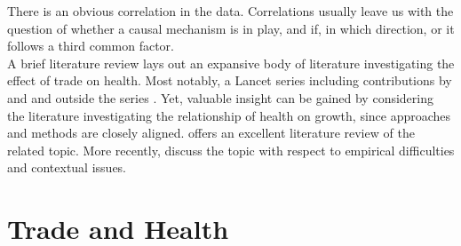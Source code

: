 \documentclass{article}
\begin{document}
There is an obvious correlation in the data. Correlations usually leave us with the question of whether a causal mechanism is in play, and if, in which direction, or it follows a third common factor.\\
A brief literature review lays out an expansive body of literature investigating the effect of trade on health. Most notably, a Lancet series including contributions by \cite{stiglitz2009trade} and \cite{smith2009trade} and outside the series \cite{lopez2017trade}. Yet, valuable insight can be gained by considering the literature investigating the relationship of health on growth, since approaches and methods are closely aligned. \cite{weil2014health} offers an excellent literature review of the related topic. More recently, \cite{bloom2018health} discuss the topic with respect to empirical difficulties and contextual issues.

\section{Trade and Health}
\end{document}
